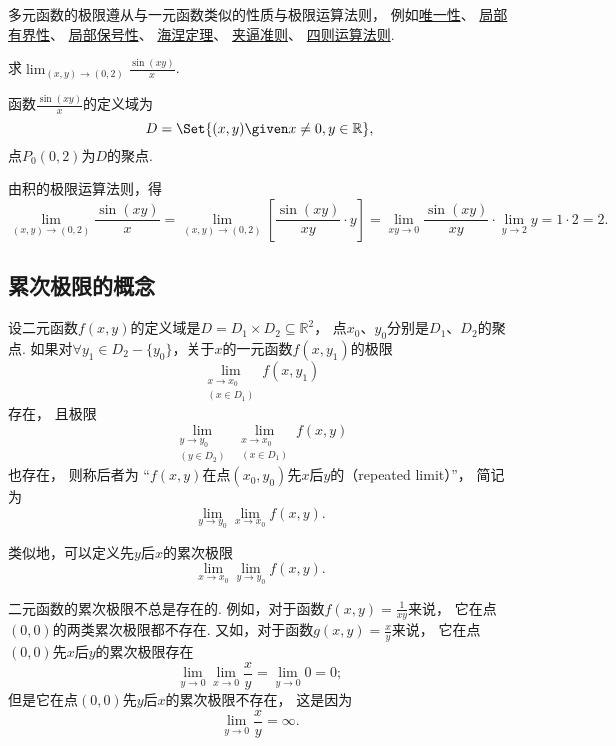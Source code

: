 多元函数的极限遵从与一元函数类似的性质与极限运算法则，
例如\hyperref[theorem:极限.函数极限的唯一性]{唯一性}、
\hyperref[theorem:极限.函数极限的局部有界性]{局部有界性}、
\hyperref[theorem:极限.函数极限的局部保号性1]{局部保号性}、
\hyperref[theorem:极限.海涅定理]{海涅定理}、
\hyperref[theorem:函数极限.夹逼准则]{夹逼准则}、
\hyperref[theorem:极限.极限的四则运算法则]{四则运算法则}.

\begin{example}
\def\l{\lim_{(x,y)\to(0,2)}}
求\(\l \frac{\sin(xy)}{x}\).
\begin{solution}
函数\(\frac{\sin(xy)}{x}\)的定义域为\[
	D = \Set{ (x,y) \given x\neq0, y\in\mathbb{R} },
\]点\(P_0(0,2)\)为\(D\)的聚点.

由积的极限运算法则，得\[
	\l \frac{\sin(xy)}{x}
	= \l \left[ \frac{\sin(xy)}{xy} \cdot y \right]
	= \lim_{xy\to0} \frac{\sin(xy)}{xy} \cdot \lim_{y\to2} y
	= 1 \cdot 2 = 2.
\]
\end{solution}
\end{example}

\subsection{累次极限的概念}
\begin{definition}
设二元函数\(f(x,y)\)的定义域是\(D = D_1 \times D_2 \subseteq \mathbb{R}^2\)，
点\(x_0\)、\(y_0\)分别是\(D_1\)、\(D_2\)的聚点.
如果对\(\forall y_1 \in D_2 - \{y_0\}\)，关于\(x\)的一元函数\(f(x,y_1)\)的极限\[
	\lim_{\substack{x \to x_0 \\ (x \in D_1)}} f(x,y_1)
\]存在，
且极限\[
	\lim_{\substack{y \to y_0 \\ (y \in D_2)}}
	\lim_{\substack{x \to x_0 \\ (x \in D_1)}} f(x,y)
\]也存在，
则称后者为
“\(f(x,y)\)在点\((x_0,y_0)\)先\(x\)后\(y\)的（repeated limit）”，
简记为\[
	\lim_{y \to y_0} \lim_{x \to x_0} f(x,y).
\]

类似地，可以定义先\(y\)后\(x\)的累次极限\[
	\lim_{x \to x_0} \lim_{y \to y_0} f(x,y).
\]
\end{definition}

二元函数的累次极限不总是存在的.
例如，对于函数\(f(x,y)=\frac1{xy}\)来说，
它在点\((0,0)\)的两类累次极限都不存在.
又如，对于函数\(g(x,y)=\frac{x}{y}\)来说，
它在点\((0,0)\)先\(x\)后\(y\)的累次极限存在\[
	\lim_{y\to0}\lim_{x\to0}\frac{x}{y}
	=\lim_{y\to0}0
	=0;
\]
但是它在点\((0,0)\)先\(y\)后\(x\)的累次极限不存在，
这是因为\[
	\lim_{y\to0}\frac{x}{y}=\infty.
\]

